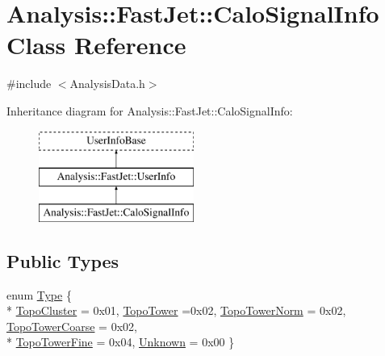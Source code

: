 \hypertarget{classAnalysis_1_1FastJet_1_1CaloSignalInfo}{}\section{Analysis\+:\+:Fast\+Jet\+:\+:Calo\+Signal\+Info Class Reference}
\label{classAnalysis_1_1FastJet_1_1CaloSignalInfo}


{\ttfamily \#include $<$Analysis\+Data.\+h$>$}

Inheritance diagram for Analysis\+:\+:Fast\+Jet\+:\+:Calo\+Signal\+Info\+:\begin{figure}[H]
\begin{center}
\leavevmode
\includegraphics[height=3.000000cm]{classAnalysis_1_1FastJet_1_1CaloSignalInfo}
\end{center}
\end{figure}
\subsection*{Public Types}
\begin{DoxyCompactItemize}
\item 
enum \hyperlink{classAnalysis_1_1FastJet_1_1CaloSignalInfo_ac03e8f6d7fb631eab49a9ab02cda7675}{Type} \{ \\*
\hyperlink{classAnalysis_1_1FastJet_1_1CaloSignalInfo_ac03e8f6d7fb631eab49a9ab02cda7675acf1212505f289985f1e261fbbca13484}{Topo\+Cluster} = 0x01, 
\hyperlink{classAnalysis_1_1FastJet_1_1CaloSignalInfo_ac03e8f6d7fb631eab49a9ab02cda7675a8a62dc4a7b24c36d548a3e382d32a403}{Topo\+Tower} =0x02, 
\hyperlink{classAnalysis_1_1FastJet_1_1CaloSignalInfo_ac03e8f6d7fb631eab49a9ab02cda7675adfd6d8fa14b4f9e9e42564c26c0773ae}{Topo\+Tower\+Norm} = 0x02, 
\hyperlink{classAnalysis_1_1FastJet_1_1CaloSignalInfo_ac03e8f6d7fb631eab49a9ab02cda7675aa6b1555b17060efe7771635af1a87519}{Topo\+Tower\+Coarse} = 0x02, 
\\*
\hyperlink{classAnalysis_1_1FastJet_1_1CaloSignalInfo_ac03e8f6d7fb631eab49a9ab02cda7675ae4a6680d4c780d03251c9065791e2792}{Topo\+Tower\+Fine} = 0x04, 
\hyperlink{classAnalysis_1_1FastJet_1_1CaloSignalInfo_ac03e8f6d7fb631eab49a9ab02cda7675a263dc44fe7b5d0fd7c5d761e23c8ea9a}{Unknown} = 0x00
 \}
\end{DoxyCompactItemize}
